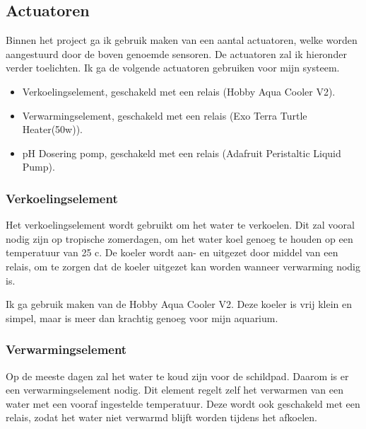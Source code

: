 \documentclass[a4paper]{report}
\begin{document}
\subsection{Actuatoren}
Binnen het project ga ik gebruik maken van een aantal actuatoren, welke worden aangestuurd door de boven genoemde sensoren.
De actuatoren zal ik hieronder verder toelichten. Ik ga de volgende actuatoren gebruiken voor mijn systeem.
\begin{itemize}
  \item Verkoelingselement, geschakeld met een relais (Hobby Aqua Cooler V2).
  \item Verwarmingselement, geschakeld met een relais (Exo Terra Turtle Heater(50w)).
  \item pH Dosering pomp, geschakeld met een relais (Adafruit Peristaltic Liquid Pump).
\end{itemize}

\subsubsection{Verkoelingselement}
Het verkoelingselement wordt gebruikt om het water te verkoelen. 
Dit zal vooral nodig zijn op tropische zomerdagen, om het water koel genoeg te houden op een temperatuur van 25 \textdegree c.
De koeler wordt aan- en uitgezet door middel van een relais, om te zorgen dat de koeler uitgezet kan worden wanneer verwarming nodig is.

Ik ga gebruik maken van de Hobby Aqua Cooler V2. Deze koeler is vrij klein en simpel, maar is meer dan krachtig genoeg voor mijn aquarium.

\subsubsection{Verwarmingselement}
Op de meeste dagen zal het water te koud zijn voor de schildpad. Daarom is er een verwarmingselement nodig. 
Dit element regelt zelf het verwarmen van een water met een vooraf ingestelde temperatuur. 
Deze wordt ook geschakeld met een relais, zodat het water niet verwarmd blijft worden tijdens het afkoelen.
\end{document}
